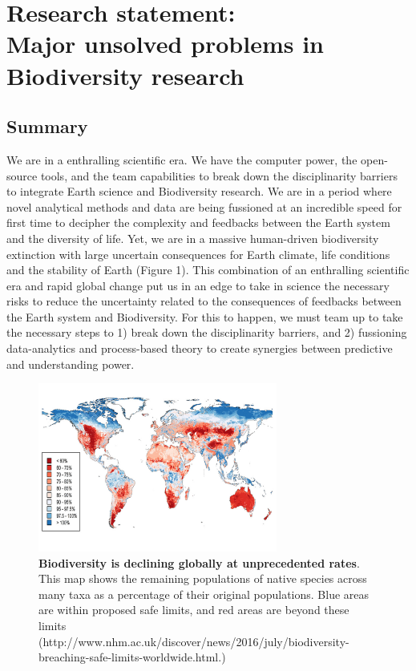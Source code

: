\documentclass[authoryear,1p,12pt]{elsarticle}
\begin{document}
\section{{\large Research statement: \\Major unsolved problems in Biodiversity research}}


\subsection{{\bf Summary}}
We are in a enthralling scientific era. We have the computer power,
the open-source tools, and the team capabilities to break down the
disciplinarity barriers to integrate Earth science and Biodiversity
research. We are in a period where novel analytical methods and data
are being fussioned at an incredible speed for first time to decipher
the complexity and feedbacks between the Earth system and the
diversity of life. Yet, we are in a massive human-driven biodiversity
extinction with large uncertain consequences for Earth climate, life
conditions and the stability of Earth (Figure 1). This combination of
an enthralling scientific era and rapid global change put us in an
edge to take in science the necessary risks to reduce the uncertainty
related to the consequences of feedbacks between the Earth system and
Biodiversity. For this to happen, we must team up to take the
necessary steps to 1) break down the disciplinarity barriers, and 2)
fussioning data-analytics and process-based theory to create synergies
between predictive and understanding power.

\begin{figure}
  \begin{center}
       \includegraphics[width=0.7\textwidth]{Figure1}
     \end{center}
     \vspace{-0.15 in}
     \caption{{\bf Biodiversity is declining globally at unprecedented
         rates}. This map shows the remaining populations of native
       species across many taxa as a percentage of their original
       populations. Blue areas are within proposed safe limits, and
       red areas are beyond these limits
       ({http://www.nhm.ac.uk/discover/news/2016/july/biodiversity-breaching-safe-limits-worldwide.html}.)}
\end{figure}
\end{document}
